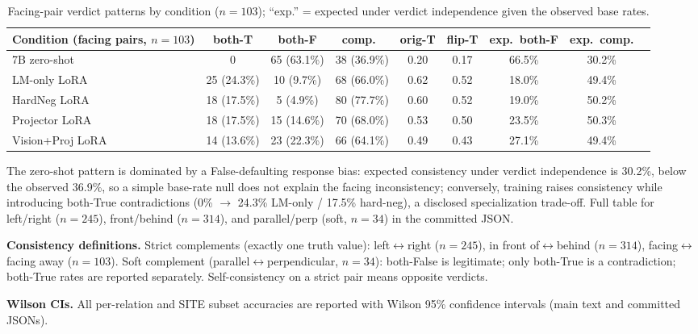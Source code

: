\begin{table}[h]
\centering
\footnotesize
\caption{Facing-pair verdict patterns by condition ($n{=}103$); ``exp.'' =
expected under verdict independence given the observed base rates.}
\label{tab:verdicts}
\begin{tabular}{lcccccccc}
\toprule
Condition (facing pairs, $n{=}103$) & both-T & both-F & comp.\ & orig-T & flip-T & exp.\ both-F & exp.\ comp. \\
\midrule
7B zero-shot & 0 & 65 (63.1\%) & 38 (36.9\%) & 0.20 & 0.17 & 66.5\% & 30.2\% \\
LM-only LoRA & 25 (24.3\%) & 10 (9.7\%) & 68 (66.0\%) & 0.62 & 0.52 & 18.0\% & 49.4\% \\
HardNeg LoRA & 18 (17.5\%) & 5 (4.9\%) & 80 (77.7\%) & 0.60 & 0.52 & 19.0\% & 50.2\% \\
Projector LoRA & 18 (17.5\%) & 15 (14.6\%) & 70 (68.0\%) & 0.53 & 0.50 & 23.5\% & 50.3\% \\
Vision+Proj LoRA & 14 (13.6\%) & 23 (22.3\%) & 66 (64.1\%) & 0.49 & 0.43 & 27.1\% & 49.4\% \\
\bottomrule
\end{tabular}
\end{table}
The zero-shot pattern is dominated by a False-defaulting response bias:
expected consistency under verdict independence is 30.2\%, below the observed
36.9\%, so a simple base-rate null does not explain the facing inconsistency;
conversely, training raises consistency while introducing both-True
contradictions (0\% $\rightarrow$ 24.3\% LM-only / 17.5\% hard-neg), a
disclosed specialization trade-off. Full table for left/right
($n{=}245$), front/behind ($n{=}314$), and parallel/perp (soft, $n{=}34$)
in the committed JSON.

\textbf{Consistency definitions.} Strict complements (exactly one truth value):
left$\leftrightarrow$right ($n{=}245$), in front of$\leftrightarrow$behind
($n{=}314$), facing$\leftrightarrow$facing away ($n{=}103$). Soft complement
(parallel$\leftrightarrow$perpendicular, $n{=}34$): both-False is legitimate;
only both-True is a contradiction; both-True rates are reported separately.
Self-consistency on a strict pair means opposite verdicts.

\textbf{Wilson CIs.} All per-relation and SITE subset accuracies are reported
with Wilson 95\% confidence intervals (main text and committed JSONs).

